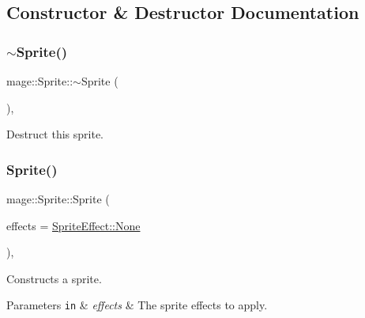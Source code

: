 \subsection{Constructor \& Destructor Documentation}
\hypertarget{classmage_1_1_sprite_a0f184574f9c035d6fbb239c1868aa670}{}\label{classmage_1_1_sprite_a0f184574f9c035d6fbb239c1868aa670} 
\subsubsection{\texorpdfstring{$\sim$\+Sprite()}{~Sprite()}}
{\footnotesize\ttfamily mage\+::\+Sprite\+::$\sim$\+Sprite (\begin{DoxyParamCaption}{ }\end{DoxyParamCaption})\hspace{0.3cm}{\ttfamily [virtual]}, {\ttfamily [default]}}

Destruct this sprite. \hypertarget{classmage_1_1_sprite_a4e7926b7fd1455afcb95e45f25b83246}{}\label{classmage_1_1_sprite_a4e7926b7fd1455afcb95e45f25b83246} 
\subsubsection{\texorpdfstring{Sprite()}{Sprite()}\hspace{0.1cm}{\footnotesize\ttfamily [1/3]}}
{\footnotesize\ttfamily mage\+::\+Sprite\+::\+Sprite (\begin{DoxyParamCaption}\item[{\hyperlink{namespacemage_a9cfe18123066ba4236f548f9de75d881}{Sprite\+Effect}}]{effects = {\ttfamily \hyperlink{namespacemage_a5e7e18b0154373ce8fc942fe3f6b27fda6adf97f83acf6453d4a6a4b1070f3754}{Sprite\+Effect\+::\+None}} }\end{DoxyParamCaption})\hspace{0.3cm}{\ttfamily [explicit]}, {\ttfamily [protected]}}

Constructs a sprite.


\begin{DoxyParams}[1]{Parameters}
\mbox{\tt in}  & {\em effects} & The sprite effects to apply. \\
\hline
\end{DoxyParams}
\hypertarget{classmage_1_1_sprite_a9c1eb4f5a85e1fa17479012dd22114a9}{}\label{classmage_1_1_sprite_a9c1eb4f5a85e1fa17479012dd22114a9} 
